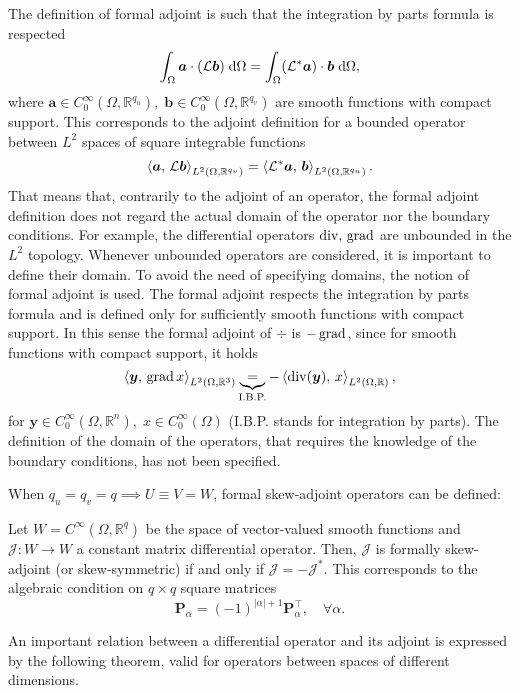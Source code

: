 \begin{remark}
The definition of formal adjoint is such that the integration by parts formula is respected
\begin{equation*}
\int_{\Omega} \bm{a} \cdot (\mathcal{L}\bm{b}) \d\Omega = \int_{\Omega} (\mathcal{L}^*\bm{a}) \cdot \bm{b} \d\Omega,
\end{equation*}
where $\bm{a} \in C^{\infty}_0(\Omega, \mathbb{R}^{q_u}), \; \bm{b} \in C^{\infty}_0(\Omega, \mathbb{R}^{q_v})$ are smooth functions with compact support. This corresponds to the adjoint definition for a bounded operator between $L^2$ spaces of square integrable functions
\begin{equation*}
\inner[L^2(\Omega, \mathbb{R}^{q_v})]{\bm{a}}{\mathcal{L}\bm{b}} = \inner[L^2(\Omega, \mathbb{R}^{q_u})]{\mathcal{L}^*\bm{a}}{\bm{b}}.
\end{equation*}
That means that, contrarily to the adjoint of an operator, the formal adjoint definition does not regard the actual domain of the operator nor the boundary conditions. For example, the differential operators $\div,\, \grad$ are unbounded in the ${L}^2$ topology. Whenever unbounded operators are considered, it is important to define their domain. To avoid the need of specifying domains, the notion of formal adjoint is used. The formal adjoint respects the integration by parts formula and is defined only for sufficiently smooth functions with compact support. In this sense the formal adjoint of $\div$  is $-\grad$, since for smooth functions with compact support, it holds
\begin{equation*}
\inner[{L}^2(\Omega, \mathbb{R}^{3})]{\bm{y}}{\grad {x}}
\underbrace{=}_{\text{I.B.P.}} -\inner[{L}^2(\Omega, \mathbb{R})]{\div(\bm{y})}{x},
\end{equation*}
for $\bm{y} \in C_0^\infty(\Omega, \mathbb{R}^{n}), \; {x} \in C_0^\infty(\Omega)$ (I.B.P. stands for integration by parts). The definition of the domain of the operators, that requires the knowledge of the boundary conditions, has not been specified. 
\end{remark}

When $q_u=q_v=q \implies U \equiv V = W$, formal skew-adjoint operators can be defined: 
\begin{definition}
	\label{def:skewOp}
	Let $W = C^{\infty}(\Omega, \mathbb{R}^{q})$ be the space of vector-valued smooth functions and $\mathcal{J}: W \rightarrow W$ a constant matrix differential operator. Then, $\mathcal{J}$ is formally skew-adjoint (or skew-symmetric) if and only if $\mathcal{J} = -\mathcal{J}^*$. This corresponds to the algebraic condition on $q \times q$ square matrices
	\begin{equation}
	\bm{P}_{\alpha} = (-1)^{|\alpha| + 1} \bm{P}_{\alpha}^\top, \quad \forall \alpha.
	\end{equation}
\end{definition}
An important relation between a differential operator and its adjoint is expressed by the following theorem, valid for operators between spaces of different dimensions.

